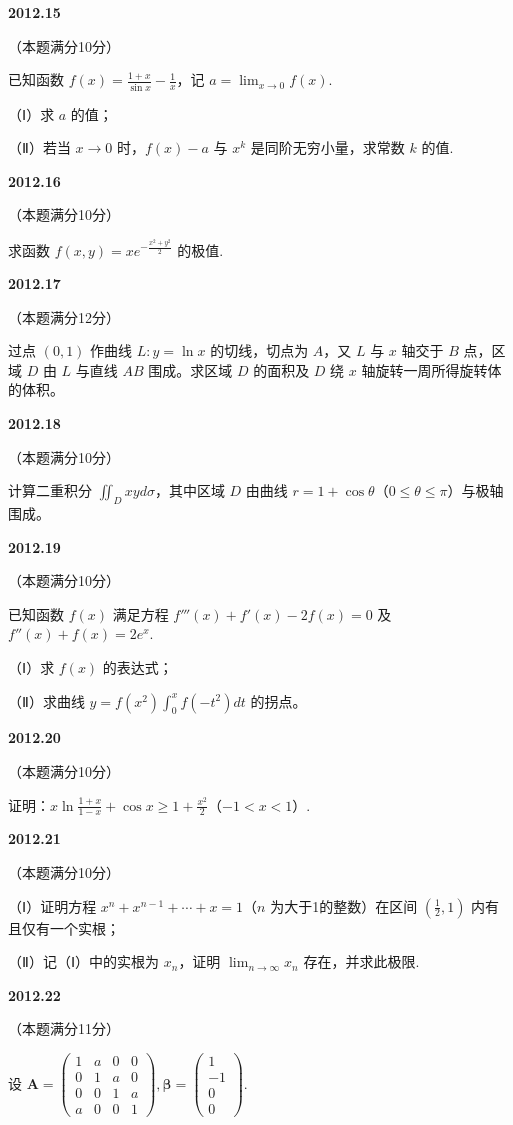 \documentclass[UTF8,12pt,fontset=windows]{ctexart}
\begin{document}
\vfill
\newpage
{\large\bfseries 2012.15}

（本题满分10分）

已知函数 $f(x) = \frac{1 + x}{\sin x} - \frac{1}{x}$，记 $a = \lim_{x \to 0}f(x)$.

（Ⅰ）求 $a$ 的值；

（Ⅱ）若当 $x \to 0$ 时，$f(x) - a$ 与 $x^k$ 是同阶无穷小量，求常数 $k$ 的值.

\vfill
\newpage
{\large\bfseries 2012.16}

（本题满分10分）

求函数 $f(x, y) = xe^{-\frac{x^2 + y^2}{2}}$ 的极值.

\vfill
\newpage
{\large\bfseries 2012.17}

（本题满分12分）

过点 $(0, 1)$ 作曲线 $L: y = \ln x$ 的切线，切点为 $A$，又 $L$ 与 $x$ 轴交于 $B$ 点，区域 $D$ 由 $L$ 与直线 $AB$ 围成。求区域 $D$ 的面积及 $D$ 绕 $x$ 轴旋转一周所得旋转体的体积。

\vfill
\newpage
{\large\bfseries 2012.18}

（本题满分10分）

计算二重积分 $\iint_D xy d\sigma$，其中区域 $D$ 由曲线 $r = 1 + \cos\theta$（$0 \le \theta \le \pi$）与极轴围成。

\vfill
\newpage
{\large\bfseries 2012.19}

（本题满分10分）

已知函数 $f(x)$ 满足方程 $f'''(x) + f'(x) - 2f(x) = 0$ 及 $f''(x) + f(x) = 2e^x$.

（Ⅰ）求 $f(x)$ 的表达式；

（Ⅱ）求曲线 $y = f(x^2)\int_0^x f(-t^2)dt$ 的拐点。

\vfill
\newpage
{\large\bfseries 2012.20}

（本题满分10分）

证明：$x\ln\frac{1 + x}{1 - x} + \cos x \ge 1 + \frac{x^2}{2}$（$-1 < x < 1$）.

\vfill
\newpage
{\large\bfseries 2012.21}

（本题满分10分）

（Ⅰ）证明方程 $x^n + x^{n-1} + \cdots + x = 1$（$n$ 为大于1的整数）在区间 $\left(\frac{1}{2}, 1\right)$ 内有且仅有一个实根；

（Ⅱ）记（Ⅰ）中的实根为 $x_n$，证明 $\lim_{n \to \infty}x_n$ 存在，并求此极限.

\vfill
\newpage
{\large\bfseries 2012.22}

（本题满分11分）

设 $\boldsymbol{A} = \begin{pmatrix} 1 & a & 0 & 0 \\ 0 & 1 & a & 0 \\ 0 & 0 & 1 & a \\ a & 0 & 0 & 1 \end{pmatrix}, \boldsymbol{\beta} = \begin{pmatrix} 1 \\ -1 \\ 0 \\ 0 \end{pmatrix}$.
\end{document}
